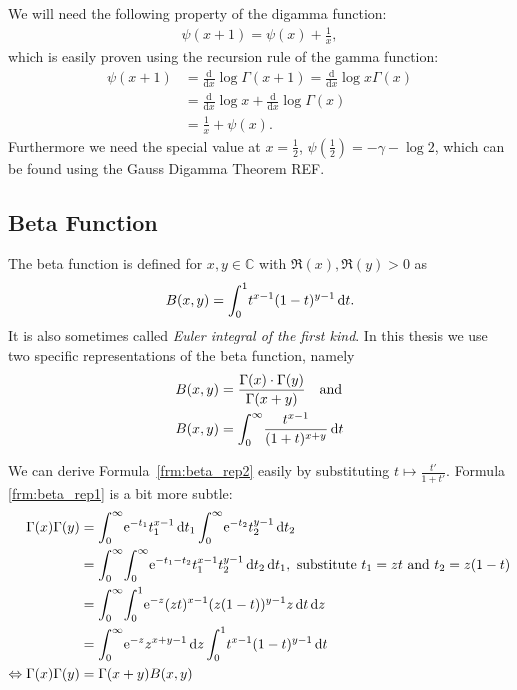 We will need the following property of the digamma function:
\begin{align}
  \psi(x + 1) = \psi(x) + \frac1x,
\end{align}
which is easily proven using the recursion rule of the gamma function:
\begin{align*}
  \psi(x+1) &= \frac{\mathrm d}{\mathrm dx}\log{\Gamma(x+1)} = \frac{\mathrm
d}{\mathrm dx}\log{x\Gamma(x)} \\
  &= \frac{\mathrm d}{\mathrm dx}\log{x} + \frac{\mathrm d}{\mathrm
  dx}\log{\Gamma(x)} \\
  &= \frac1x + \psi(x).
\end{align*}
Furthermore we need the special value at $x = \frac12$, $\psi(\frac12) =
-\gamma-\log 2$, which can be found using the Gauss Digamma Theorem REF.

\subsection{Beta Function}
\label{sec:beta_function}
The beta function is defined for $x,y\in\mathbb{C}$ with $\Re(x),\Re(y) > 0$ as
\begin{align}
    B(x,y) = \Integ[1]{0}{t}{t^{x-1}(1-t)^{y-1}}.
    \label{def:beta}
\end{align}
It is also sometimes called \textit{Euler integral of the first kind}. In this
thesis we use two specific representations of the beta function, namely
\begin{align}
    B(x, y) &= \frac{\Gamma(x)\cdot\Gamma(y)}{\Gamma(x+y)} \quad \text{and}
    \label{frm:beta_rep1} \\
    B(x, y) &= \Integ[\infty]{0}{t}{\frac{t^{x-1}}{(1 + t)^{x+y}}}
    \label{frm:beta_rep2}
\end{align}

We can derive Formula~\ref{frm:beta_rep2} easily by substituting $t \mapsto
\frac{t'}{1+t'}$. Formula \ref{frm:beta_rep1} is a bit more subtle:
\begin{align*}
    \Gamma(x) \Gamma(y) &= \Integ[\infty]{0}{t_1}{\Eto{-t_1}t_1^{x-1}}
                           \Integ[\infty]{0}{t_2}{\Eto{-t_2}t_2^{y-1}} \\
    &= \Integ[\infty]{0}{t_1}{
        \Integ[\infty]{0}{t_2}{
            \Eto{-t_1-t_2}t_1^{x-1}t_2^{y-1}
            }
        },\text{ substitute $t_1 = zt$ and $t_2 = z(1-t)$} \\
    &= \Integ[\infty]{0}{z}{
        \Integ[1]{0}{t}{
            \Eto{-z}(zt)^{x-1}(z(1-t))^{y-1}z
            }
        } \\
        &= \Integ[\infty]{0}{z}{
            \Eto{-z}z^{x+y-1}
            }
            \Integ[1]{0}{t}{t^{x-1}(1-t)^{y-1}} \\
    \Leftrightarrow \Gamma(x)\Gamma(y) &= \Gamma(x+y)B(x,y)
\end{align*}

